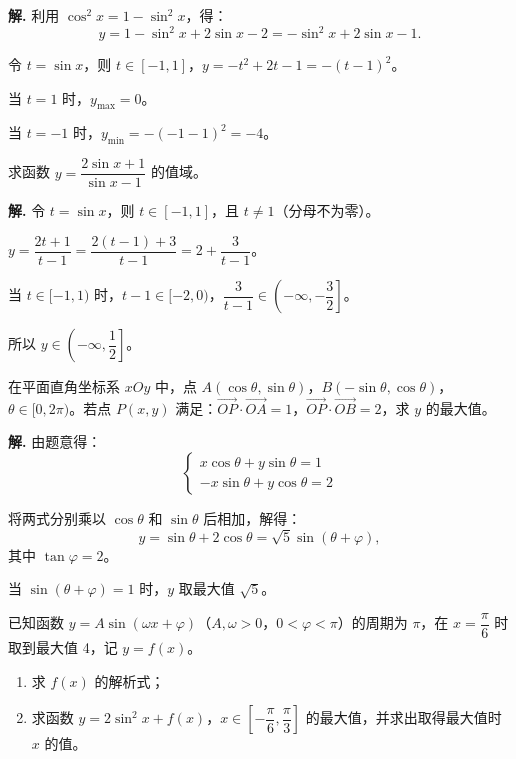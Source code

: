\documentclass[11pt]{ctexrep}
\begin{document}
\textbf{解.} 利用 $\cos^2 x = 1 - \sin^2 x$，得：
\[
    y = 1 - \sin^2 x + 2\sin x - 2 = -\sin^2 x + 2\sin x - 1.
\]

令 $t = \sin x$，则 $t \in [-1, 1]$，$y = -t^2 + 2t - 1 = -(t - 1)^2$。

当 $t = 1$ 时，$y_{\max} = 0$。

当 $t = -1$ 时，$y_{\min} = -(-1 - 1)^2 = -4$。

\begin{example}[分式型三角函数最值]
    求函数 $y = \dfrac{2\sin x + 1}{\sin x - 1}$ 的值域。
\end{example}

\textbf{解.} 令 $t = \sin x$，则 $t \in [-1, 1]$，且 $t \neq 1$（分母不为零）。

$y = \dfrac{2t + 1}{t - 1} = \dfrac{2(t - 1) + 3}{t - 1} = 2 + \dfrac{3}{t - 1}$。

当 $t \in [-1, 1)$ 时，$t - 1 \in [-2, 0)$，$\dfrac{3}{t - 1} \in \left(-\infty, -\dfrac{3}{2}\right]$。

所以 $y \in \left(-\infty, \dfrac{1}{2}\right]$。

\begin{example}
    在平面直角坐标系 $xOy$ 中，点 $A(\cos\theta, \sin\theta)$，$B(-\sin\theta, \cos\theta)$，$\theta \in [0, 2\pi)$。若点 $P(x, y)$ 满足：$\overrightarrow{OP} \cdot \overrightarrow{OA} = 1$，$\overrightarrow{OP} \cdot \overrightarrow{OB} = 2$，求 $y$ 的最大值。
\end{example}

\textbf{解.} 由题意得：
\[
    \begin{cases}
        x\cos\theta + y\sin\theta = 1 \\
        -x\sin\theta + y\cos\theta = 2
    \end{cases}
\]

将两式分别乘以 $\cos\theta$ 和 $\sin\theta$ 后相加，解得：
\[
    y = \sin\theta + 2\cos\theta = \sqrt{5}\sin(\theta + \varphi),
\]
其中 $\tan\varphi = 2$。

当 $\sin(\theta + \varphi) = 1$ 时，$y$ 取最大值 $\sqrt{5}$。

\begin{realexam}[2026 松江高三一模]
    已知函数 $y = A\sin(\omega x + \varphi)$（$A, \omega > 0$，$0 < \varphi < \pi$）的周期为 $\pi$，在 $x = \dfrac{\pi}{6}$ 时取到最大值 4，记 $y = f(x)$。
    \begin{enumerate}
        \item 求 $f(x)$ 的解析式；
        \item 求函数 $y = 2\sin^2 x + f(x)$，$x \in \left[-\dfrac{\pi}{6}, \dfrac{\pi}{3}\right]$ 的最大值，并求出取得最大值时 $x$ 的值。
    \end{enumerate}
\end{realexam}
\end{document}
